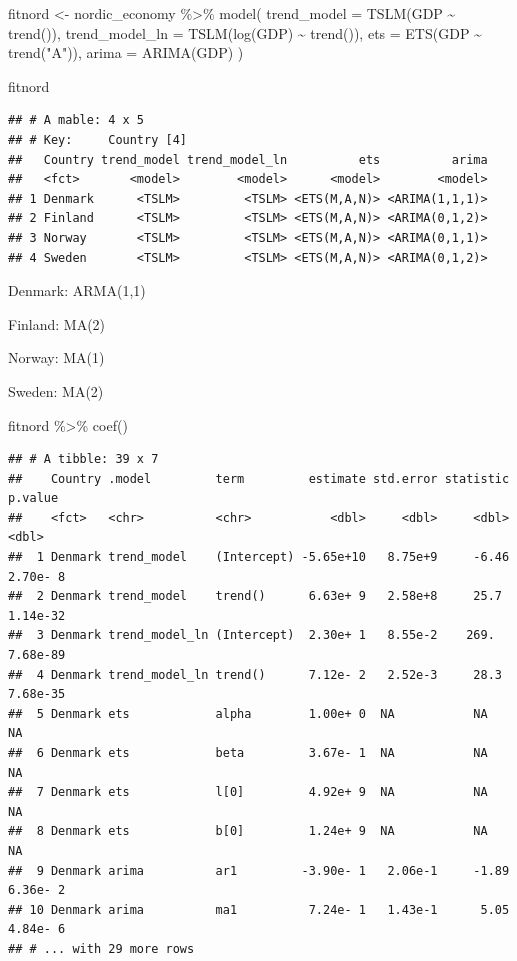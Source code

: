 \documentclass[
]{book}
\newenvironment{Shaded}{\begin{snugshade}}{\end{snugshade}}
\newcommand{\AttributeTok}[1]{\textcolor[rgb]{0.77,0.63,0.00}{#1}}
\newcommand{\FunctionTok}[1]{\textcolor[rgb]{0.00,0.00,0.00}{#1}}
\newcommand{\NormalTok}[1]{#1}
\newcommand{\OtherTok}[1]{\textcolor[rgb]{0.56,0.35,0.01}{#1}}
\newcommand{\SpecialCharTok}[1]{\textcolor[rgb]{0.00,0.00,0.00}{#1}}
\newcommand{\StringTok}[1]{\textcolor[rgb]{0.31,0.60,0.02}{#1}}
\begin{document}
\begin{Shaded}
\begin{Highlighting}[]
\NormalTok{fitnord }\OtherTok{\textless{}{-}}\NormalTok{ nordic\_economy }\SpecialCharTok{\%\textgreater{}\%}
  \FunctionTok{model}\NormalTok{(}
    \AttributeTok{trend\_model =} \FunctionTok{TSLM}\NormalTok{(GDP }\SpecialCharTok{\textasciitilde{}} \FunctionTok{trend}\NormalTok{()),}
    \AttributeTok{trend\_model\_ln =} \FunctionTok{TSLM}\NormalTok{(}\FunctionTok{log}\NormalTok{(GDP) }\SpecialCharTok{\textasciitilde{}} \FunctionTok{trend}\NormalTok{()),}
    \AttributeTok{ets =} \FunctionTok{ETS}\NormalTok{(GDP }\SpecialCharTok{\textasciitilde{}} \FunctionTok{trend}\NormalTok{(}\StringTok{"A"}\NormalTok{)),}
    \AttributeTok{arima =} \FunctionTok{ARIMA}\NormalTok{(GDP)}
\NormalTok{  )}

\NormalTok{fitnord}
\end{Highlighting}
\end{Shaded}

\begin{verbatim}
## # A mable: 4 x 5
## # Key:     Country [4]
##   Country trend_model trend_model_ln          ets          arima
##   <fct>       <model>        <model>      <model>        <model>
## 1 Denmark      <TSLM>         <TSLM> <ETS(M,A,N)> <ARIMA(1,1,1)>
## 2 Finland      <TSLM>         <TSLM> <ETS(M,A,N)> <ARIMA(0,1,2)>
## 3 Norway       <TSLM>         <TSLM> <ETS(M,A,N)> <ARIMA(0,1,1)>
## 4 Sweden       <TSLM>         <TSLM> <ETS(M,A,N)> <ARIMA(0,1,2)>
\end{verbatim}

Denmark: ARMA(1,1)

Finland: MA(2)

Norway: MA(1)

Sweden: MA(2)

\begin{Shaded}
\begin{Highlighting}[]
\NormalTok{fitnord }\SpecialCharTok{\%\textgreater{}\%} \FunctionTok{coef}\NormalTok{() }
\end{Highlighting}
\end{Shaded}

\begin{verbatim}
## # A tibble: 39 x 7
##    Country .model         term         estimate std.error statistic   p.value
##    <fct>   <chr>          <chr>           <dbl>     <dbl>     <dbl>     <dbl>
##  1 Denmark trend_model    (Intercept) -5.65e+10   8.75e+9     -6.46  2.70e- 8
##  2 Denmark trend_model    trend()      6.63e+ 9   2.58e+8     25.7   1.14e-32
##  3 Denmark trend_model_ln (Intercept)  2.30e+ 1   8.55e-2    269.    7.68e-89
##  4 Denmark trend_model_ln trend()      7.12e- 2   2.52e-3     28.3   7.68e-35
##  5 Denmark ets            alpha        1.00e+ 0  NA           NA    NA       
##  6 Denmark ets            beta         3.67e- 1  NA           NA    NA       
##  7 Denmark ets            l[0]         4.92e+ 9  NA           NA    NA       
##  8 Denmark ets            b[0]         1.24e+ 9  NA           NA    NA       
##  9 Denmark arima          ar1         -3.90e- 1   2.06e-1     -1.89  6.36e- 2
## 10 Denmark arima          ma1          7.24e- 1   1.43e-1      5.05  4.84e- 6
## # ... with 29 more rows
\end{verbatim}
\end{document}

